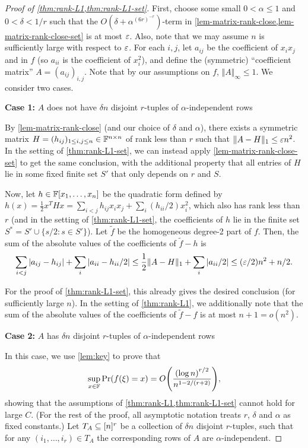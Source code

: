 \documentclass{daj}
\theoremstyle{plain}
\theoremstyle{plain}
\theoremstyle{plain}
\theoremstyle{plain}
\theoremstyle{definition}
\theoremstyle{plain}
\theoremstyle{plain}
\theoremstyle{definition}
\theoremstyle{definition}
\theoremstyle{plain}
\let\originalleft\left
\let\originalright\right
\renewcommand{\left}{\mathopen{}\mathclose\bgroup\originalleft}
\renewcommand{\right}{\aftergroup\egroup\originalright}
\begin{document}
\begin{proof}
[Proof of \cref{thm:rank-L1,thm:rank-L1-set}]
First, choose some small $0<\alpha\leq 1$ and $0<\delta<1/r$ such that the $O(\delta+\alpha^{(6r)^{-r}})$-term in \cref{lem-matrix-rank-close,lem-matrix-rank-close-set} is at most $\varepsilon$. Also, note that we may assume $n$ is sufficiently large with respect to $\varepsilon$. For each $i,j$, let $a_{ij}$ be the coefficient of $x_ix_j$ and in $f$ (so $a_{ii}$ is the coefficient of $x_i^2$), and define the (symmetric) ``coefficient matrix'' $A=(a_{ij})_{i,j}$. Note that by our assumptions on $f$, $\Vert A\Vert_\infty\le 1$. We consider two cases.

{\bf Case 1:} $A$ does not have $\delta n$ disjoint $r$-tuples of $\alpha$-independent rows

By \cref{lem-matrix-rank-close} (and our choice of $\delta$ and $\alpha$), there exists a symmetric matrix $H=(h_{ij})_{1\leq i,j\leq n}\in \mathbb{F}^{n\times n}$ of rank less than $r$ such that $\Vert A-H\Vert_1\leq\varepsilon n^2$. In the setting of \cref{thm:rank-L1-set}, we can instead apply \cref{lem-matrix-rank-close-set} to get the same conclusion, with the additional property that all entries of $H$ lie in some fixed finite set $S'$ that only depends on $r$ and $S$.

Now, let $h\in \mathbb{F}[x_1,\dots,x_n]$ be the quadratic form defined by $h(x)=\frac{1}{2}x^T H x=\sum_{i<j} h_{ij}x_ix_j+\sum_i (h_{ii}/2)x_i^2$, which also has rank less than $r$ (and in the setting of \cref{thm:rank-L1-set}, the coefficients of $h$ lie in the finite set $S^*=S'\cup \lbrace s/2: s\in S'\rbrace$). Let $\tilde f$ be the homogeneous degree-2 part of $f$. Then, the sum of the absolute values of the coefficients of $\tilde f-h$ is
\[
\sum_{i<j} |a_{ij}-h_{ij}|+\sum_i  |a_{ii}-h_{ii}/2|\le \frac{1}{2}\Vert A-H\Vert_1+\sum_i |a_{ii}/2|\le (\varepsilon/2)n^2+n/2.
\]

For the proof of \cref{thm:rank-L1-set}, this already gives the desired conclusion (for sufficiently large $n$). In the setting of \cref{thm:rank-L1}, we additionally note that the sum of the absolute values of the coefficients of $\tilde f-f$ is at most $n+1=o(n^2)$.

{\bf Case 2:} $A$ has $\delta n$ disjoint $r$-tuples of $\alpha$-independent rows\nopagebreak

In this case, we use \cref{lem:key} to prove that
\[\sup_{x\in \FF}\Pr\left(f(\xi)=x\right)=O\left(\frac{\left(\log n\right)^{r/2}}{n^{1-2/\left(r+2\right)}}\right),\]
showing that the assumptions of \cref{thm:rank-L1,thm:rank-L1-set} cannot hold for large $C$. (For the rest of the proof, all asymptotic notation treats $r$, $\delta$ and $\alpha$ as fixed constants.) Let $T_A\subseteq [n]^r$ be a collection of $\delta n$ disjoint $r$-tuples, such that for any $(i_1,\dots,i_r)\in T_A$ the corresponding rows of $A$ are $\alpha$-independent.


\end{proof}
\end{document}
